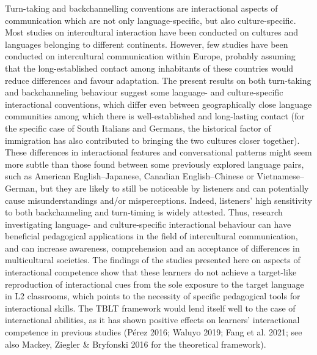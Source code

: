 \begin{stylecaption}
\textup{Turn-taking and backchannelling conventions are interactional aspects of communication which are not only language-specific, but also culture-specific. Most studies on intercultural interaction have been conducted on cultures and languages belonging to different continents. However, few studies have been conducted on intercultural communication within Europe, probably assuming that the long-established contact among inhabitants of these countries would reduce differences and favour adaptation. The present results on both turn-taking and backchanneling behaviour suggest some language- and culture-specific interactional conventions, which differ even between geographically close language communities among which there is well-established and long-lasting contact (for the specific case of South Italians and Germans, the historical factor of immigration has also contributed to bringing the two cultures closer together). These differences in interactional features and conversational patterns might seem more subtle than those found between some previously explored language pairs, such as American English–Japanese, Canadian English–Chinese or Vietnamese–German, but they are likely to still be noticeable by listeners and can potentially cause misunderstandings and/or misperceptions. Indeed, listeners’ high sensitivity to both backchanneling and turn-timing is widely attested. Thus, research investigating language- and culture-specific interactional behaviour can have beneficial pedagogical applications in the field of intercultural communication, and can increase awareness, comprehension and an acceptance of differences in multicultural societies. The findings of the studies presented here on aspects of interactional competence show that these learners do not achieve a target-like reproduction of interactional cues from the sole exposure to the target language in L2 classrooms, which points to the necessity of specific pedagogical tools for interactional skills. The TBLT framework would lend itself well to the case of interactional abilities, as it has shown positive effects on learners’ interactional competence in previous studies }\textup{(Pérez 2016; Waluyo 2019; Fang et al. 2021; see also Mackey, Ziegler \& Bryfonski 2016 for the theoretical framework)}\textup{.}
\end{stylecaption}

